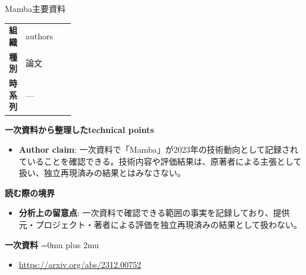 \begin{technicalnote}{Mamba}{主要資料}
\begingroup
\begin{tabularx}{\linewidth}{@{}>{\bfseries}p{0.22\linewidth}X@{}}
組織 & authors \\
種別 & 論文 \\
時系列 & — \\
\end{tabularx}
\smallskip
{\bfseries 一次資料から整理したtechnical points}
\begin{itemize}[leftmargin=1.5em,itemsep=0.35em]
\item \textbf{Author claim}: 一次資料で「Mamba」が2023年の技術動向として記録されていることを確認できる。技術内容や評価結果は、原著者による主張として扱い、独立再現済みの結果とはみなさない。
\end{itemize}
\begin{minipage}{\linewidth}
{\bfseries 読む際の境界}
\begin{itemize}[leftmargin=1.5em,itemsep=0.35em]
\item \textbf{分析上の留意点}: 一次資料で確認できる範囲の事実を記録しており、提供元・プロジェクト・著者による評価を独立再現済みの結果として扱わない。
\end{itemize}
\begin{samepage}
{\bfseries 一次資料}
\begingroup\sloppy
\Urlmuskip=0mu plus 2mu\relax
\begin{itemize}[leftmargin=1.5em,itemsep=0.25em]
\item {\scriptsize\url{https://arxiv.org/abs/2312.00752}}
\end{itemize}
\endgroup
\end{samepage}
\end{minipage}
\endgroup
\end{technicalnote}
\medskip
